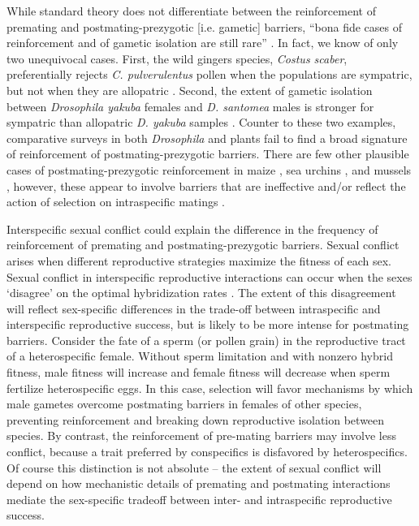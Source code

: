 \documentclass[11pt]{article}
\begin{document}
While standard theory does not differentiate between the reinforcement of premating  and postmating-prezygotic [i.e. gametic] barriers, ``bona fide cases of reinforcement and of gametic isolation are still rare'' \citep{turissini2018}. %
In fact, we know of only two unequivocal cases. 
First, the wild gingers species,  \textit{Costus scaber}, preferentially rejects  \textit{C. pulverulentus} pollen when the populations are sympatric, but not when they are allopatric \citep{kay2008}.  %
Second, the extent of gametic isolation between \textit{Drosophila yakuba} females and \textit{D. santomea} males is stronger for sympatric than allopatric \textit{D. yakuba} samples \citep{matute2010}. 
Counter to these two examples, comparative surveys in both \textit{Drosophila} \citep{turissini2018} and plants \citep{moyle2004} fail to find a broad signature of reinforcement of postmating-prezygotic barriers. 
There are few other plausible cases of postmating-prezygotic reinforcement in maize \citep{kermicle2006}, sea urchins \citep{lessios2007,geyer2003,zigler2003}, and mussels \citep{slaughter2008}, however, these appear to involve barriers that are ineffective \citep{slaughter2008} and/or reflect the action of selection on intraspecific matings \citep{geyer2009}. 

Interspecific sexual conflict could explain the difference in the frequency of reinforcement of premating and postmating-prezygotic barriers.   
Sexual conflict arises when different reproductive strategies maximize the fitness of each sex.    
 Sexual conflict in interspecific reproductive interactions can occur when the sexes `disagree' on the optimal hybridization rates \citep{parker1998}.  
The extent of this disagreement will reflect sex-specific differences in the trade-off between intraspecific and interspecific reproductive success, but is likely to be more intense for postmating barriers.
Consider the fate of a sperm (or pollen grain) in the reproductive tract of a heterospecific female. 
Without sperm limitation and with nonzero hybrid fitness, male fitness will increase and female fitness will decrease when sperm fertilize heterospecific eggs.   
In this case, selection will favor mechanisms by which male gametes overcome postmating barriers in females of other species, preventing reinforcement and breaking down reproductive isolation between species.   
By contrast, the reinforcement of pre-mating barriers may involve less conflict, because a trait preferred by conspecifics is disfavored by heterospecifics.   
Of course this distinction is not absolute --  the extent of sexual conflict will depend on how mechanistic details of premating and postmating interactions mediate the  sex-specific tradeoff between inter- and intraspecific reproductive success. 
\end{document}
